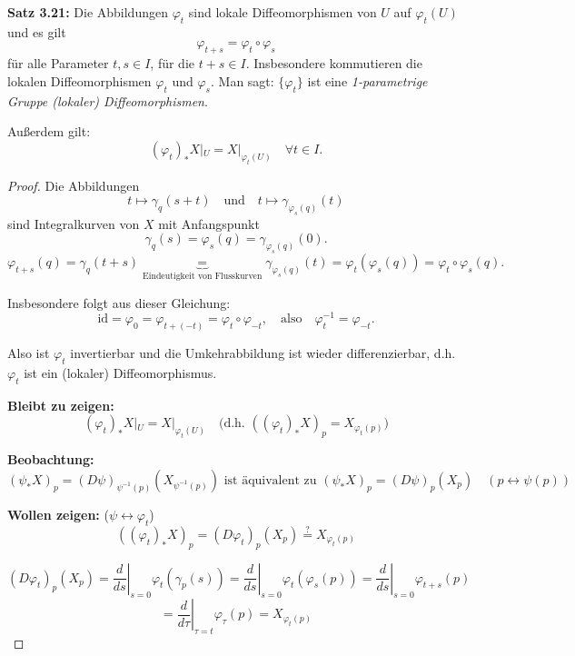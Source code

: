 \documentclass[fleqn, 12pt, letterpaper]{article}
\newcommand{\txt}[1]{\text{#1}}
\begin{document}
\vspace{1em}

\textbf{Satz 3.21:}  
Die Abbildungen \(\varphi_t\) sind lokale Diffeomorphismen von \(U\) auf \(\varphi_t(U)\) und es gilt
\[
\varphi_{t+s} = \varphi_t \circ \varphi_s
\]
für alle Parameter \(t,s \in I\), für die \(t+s \in I\).  
Insbesondere kommutieren die lokalen Diffeomorphismen \(\varphi_t\) und \(\varphi_s\).  
Man sagt: \(\{\varphi_t\}\) ist eine \emph{1-parametrige Gruppe (lokaler) Diffeomorphismen}.

Außerdem gilt:
\[
(\varphi_t)_* X|_U = X|_{\varphi_t(U)} \quad \forall t \in I.
\]

\begin{proof}
    Die Abbildungen
\[
t \mapsto \gamma_q(s + t) \quad \text{und} \quad t \mapsto \gamma_{\varphi_s(q)}(t)
\]
sind Integralkurven von \(X\) mit Anfangspunkt
\[
\gamma_q(s) = \varphi_s(q)=\gamma_{\varphi_s(q)}(0).
\]
\[
\varphi_{t+s}(q) = \gamma_q(t + s) \underbrace=_{\txt{Eindeutigkeit von Flusskurven}} \gamma_{\varphi_s(q)}(t) = \varphi_t(\varphi_s(q))=\varphi_t\circ\varphi_s(q).
\]

Insbesondere folgt aus dieser Gleichung:
\[
\mathrm{id} = \varphi_0 = \varphi_{t + (-t)} = \varphi_t \circ \varphi_{-t}, \quad \text{also} \quad \varphi_t^{-1} = \varphi_{-t}.
\]

Also ist \(\varphi_t\) invertierbar und die Umkehrabbildung ist wieder differenzierbar, d.h. \(\varphi_t\) ist ein (lokaler) Diffeomorphismus.


\textbf{Bleibt zu zeigen:}  
\[
(\varphi_t)_* X|_U = X|_{\varphi_t(U)} \quad \text{(d.h. } ((\varphi_t)_* X)_p = X_{\varphi_t(p)})
\]

\textbf{Beobachtung:}  
\[
(\psi_*X)_p = (D\psi)_{\psi^{-1}(p)}(X_{\psi^{-1}(p)}) \text{ ist äquivalent zu } (\psi_*X)_{p}  = (D\psi)_p(X_p) \quad (p\leftrightarrow \psi(p))
\]

\textbf{Wollen zeigen:} ($\psi \leftrightarrow \varphi_t$)
\[
((\varphi_t)_* X)_{p} = (D \varphi_t)_p (X_p) \overset{?}{=} X_{\varphi_t(p)}
\]

\[
(D\varphi_t)_p (X_p)
= \left. \frac{d}{ds} \right|_{s=0} \varphi_t(\gamma_p(s))
= \left. \frac{d}{ds} \right|_{s=0} \varphi_t(\varphi_s(p))
= \left. \frac{d}{ds} \right|_{s=0} \varphi_{t+s}(p)
\]
\[= \left. \frac{d}{d\tau} \right|_{\tau=t} \varphi_\tau(p)= X_{\varphi_t(p)}\]
\end{proof}

\newpage
\end{document}
